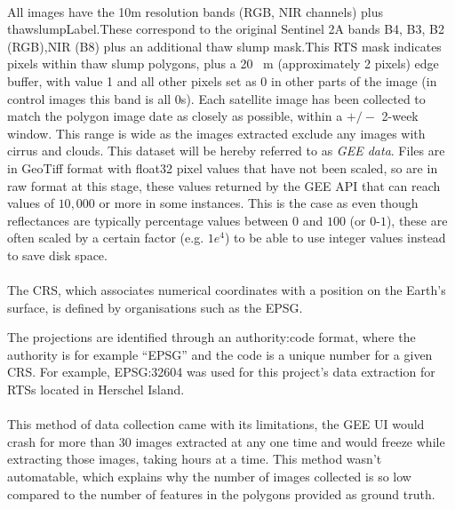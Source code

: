 \paragraph{}
All images have the 10m resolution bands (\gls{RGB}, \gls{NIR} channels) plus thawslumpLabel.These correspond to the original Sentinel 2A bands B4, B3, B2 (\gls{RGB}),\gls{NIR} (B8) plus an additional thaw slump mask.This \gls{RTS} mask indicates pixels within thaw slump polygons, plus a 20 \SI{}{\metre} (approximately 2 pixels) edge buffer, with value 1 and all other pixels set as 0 in other parts of the image (in control images this band is all 0s).
 Each satellite image has been collected to match the polygon image date as closely as possible, within a $+/-$ 2-week window. This range is wide as the images extracted exclude any images with cirrus and clouds. This dataset will be hereby referred to as \textit{\gls{GEE} data}.
%
% 
Files are in GeoTiff format with float32 pixel values that have not been scaled, so are in raw format at this stage, these values returned by the \gls{GEE} API that can reach values of $10,000$ or more in some instances. This is the case as even though reflectances are typically percentage values between $0$ and $100$ (or $0$-$1$), these are often scaled by a certain factor (e.g. $1 e^4$) to be able to use integer values instead to save disk space. 

\paragraph{}
The \gls{CRS}, which associates numerical coordinates with a position on the Earth's surface, is defined by organisations such as the \gls{EPSG}.

The projections are identified through an authority:code format, where the authority is for example “\gls{EPSG}” and the code is a unique number for a given \gls{CRS}. For example, \gls{EPSG}:32604 was used for this project's data extraction for \gls{RTS}s located in Herschel Island.

\paragraph{}
This method of data collection came with its limitations, the \gls{GEE} \gls{UI} would crash for more than 30 images extracted at any one time and would freeze while extracting those images, taking hours at a time. This method wasn't automatable, which explains why the number of images collected is so low compared to the number of features in the polygons provided as ground truth.


